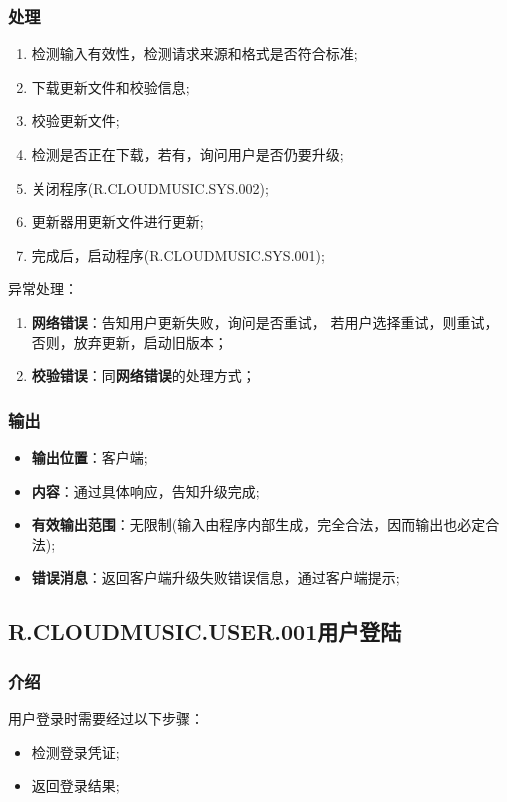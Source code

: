 \begin{enumerate}
\subsubsection{处理}
	\begin{enumerate}
	\item 检测输入有效性，检测请求来源和格式是否符合标准;
  \item 下载更新文件和校验信息;
    \item 校验更新文件;
		\item 检测是否正在下载，若有，询问用户是否仍要升级;
		\item 关闭程序(R.CLOUDMUSIC.SYS.002);
		\item 更新器用更新文件进行更新;
		\item 完成后，启动程序(R.CLOUDMUSIC.SYS.001);
	\end{enumerate}
	\noindent 异常处理：
	\begin{enumerate}
		\item \textbf{网络错误}：告知用户更新失败，询问是否重试，
			若用户选择重试，则重试，否则，放弃更新，启动旧版本；
		\item \textbf{校验错误}：同\textbf{网络错误}的处理方式；
	\end{enumerate}
\subsubsection{输出}
\begin{itemize}
	\item \textbf{输出位置}：客户端;
	\item \textbf{内容}：通过具体响应，告知升级完成;
	\item \textbf{有效输出范围}：无限制(输入由程序内部生成，完全合法，因而输出也必定合法);
	\item \textbf{错误消息}：返回客户端升级失败错误信息，通过客户端提示;
\end{itemize}

\subsection{R.CLOUDMUSIC.USER.001用户登陆}
\subsubsection{介绍}
用户登录时需要经过以下步骤：
	\begin{itemize}
		\item 检测登录凭证;
		\item 返回登录结果;
	\end{itemize}

\end{enumerate}

